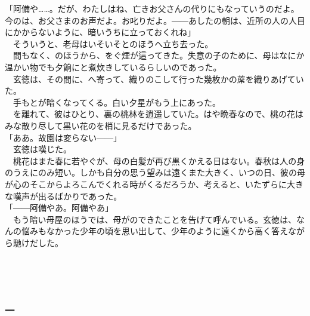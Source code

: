 \documentclass[
  paper=a5,
  fontsize=10pt,
  jafontsize=9.5pt,
  tate,                  %
  open_bracket_pos=nibu, %
]{jlreq}
\begin{document}
「阿備や……。だが、わたしはね、亡きお父さんの代りにもなっていうのだよ。今のは、お父さまのお声だよ。お叱りだよ。――あしたの朝は、近所の人の人目にかからないように、暗いうちに立っておくれね」\\


　そういうと、老母はいそいそとのほうへ立ち去った。\\


　間もなく、のほうから、をぐ煙が這ってきた。失意の子のために、母はなにか温かい物でも夕餉にと煮炊きしているらしいのであった。\\


　玄徳は、その間に、へ寄って、織りのこして行った幾枚かの蓆を織りあげていた。\\


　手もとが暗くなってくる。白い夕星がもう上にあった。\\


　を離れて、彼はひとり、裏の桃林を逍遥していた。はや晩春なので、桃の花はみな散り尽して黒い花のを梢に見るだけであった。\\


「ああ。故園は変らない――」\\


　玄徳は嘆じた。\\


　桃花はまた春に若やぐが、母の白髪が再び黒くかえる日はない。春秋は人の身のうえにのみ短い。しかも自分の思う望みは遠くまた大きく、いつの日、彼の母が心のそこからよろこんでくれる時がくるだろうか、考えると、いたずらに大きな嘆声が出るばかりであった。\\


「――阿備やあ。阿備やあ」\\


　もう暗い母屋のほうでは、母がのできたことを告げて呼んでいる。玄徳は、なんの悩みもなかった少年の頃を思い出して、少年のように遠くから高く答えながら馳けだした。\\

\\

\subsection{}

\\

\subsubsection{一}
\end{document}
